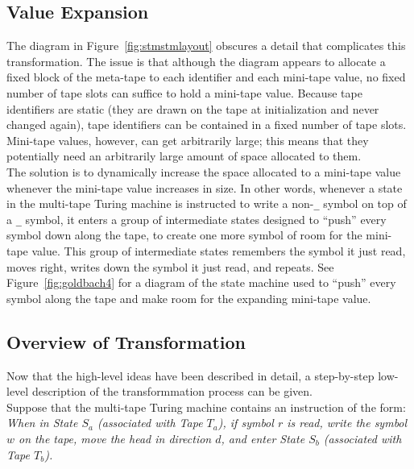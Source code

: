 \documentclass[11pt]{report}
\begin{document}
\subsection{Value Expansion}

The diagram in Figure~\ref{fig:stmstmlayout} obscures a detail that complicates this transformation. The issue is that although the diagram appears to allocate a fixed block of the meta-tape to each identifier and each mini-tape value, no fixed number of tape slots can suffice to hold a mini-tape value. Because tape identifiers are static (they are drawn on the tape at initialization and never changed again), tape identifiers can be contained in a fixed number of tape slots. Mini-tape values, however, can get arbitrarily large; this means that they potentially need an arbitrarily large amount of space allocated to them. \\

The solution is to dynamically increase the space allocated to a mini-tape value whenever the mini-tape value increases in size. In other words, whenever a state in the multi-tape Turing machine is instructed to write a non-\texttt{\_} symbol on top of a \texttt{\_} symbol, it enters a group of intermediate states designed to ``push'' every symbol down along the tape, to create one more symbol of room for the mini-tape value. This group of intermediate states remembers the symbol it just read, moves right, writes down the symbol it just read, and repeats. See Figure~\ref{fig:goldbach4} for a diagram of the state machine used to ``push'' every symbol along the tape and make room for the expanding mini-tape value. \\

\subsection{Overview of Transformation \label{mttoststeps}}

Now that the high-level ideas have been described in detail, a step-by-step low-level description of the transformmation process can be given. \\

Suppose that the multi-tape Turing machine contains an instruction of the form: \\

\emph{When in State $S_a$ (associated with Tape $T_a$), if symbol $r$ is read, write the symbol $w$ on the tape, move the head in direction $d$, and enter State $S_b$ (associated with Tape $T_b$).} \\
\end{document}
